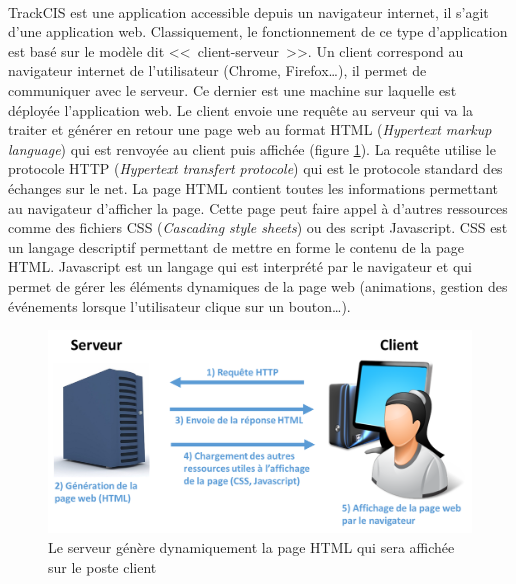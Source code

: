 			\paragraph{}%
			TrackCIS est une application accessible depuis un navigateur internet, il
			s'agit d'une application web. Classiquement, le fonctionnement de ce type
			d'application est basé sur le modèle dit <<~client-serveur~>>. Un client
			correspond au navigateur internet de l'utilisateur (Chrome, Firefox\ldots),
			il permet de communiquer avec le serveur. Ce dernier est une machine sur
			laquelle est déployée l'application web. Le client envoie une requête au
			serveur qui va la traiter et générer en retour une page web au format HTML
			(\textit{Hypertext markup language}) qui est renvoyée au client puis affichée
			(figure \ref{client_serveur}). La requête utilise le protocole HTTP
			(\textit{Hypertext transfert protocole}) qui est le protocole standard des
			échanges sur le net. La page HTML contient toutes les informations permettant au
			navigateur d'afficher la page. Cette page peut faire appel à d'autres
			ressources comme des fichiers CSS (\textit{Cascading style sheets}) ou des
			script Javascript. CSS est un langage descriptif permettant de mettre en forme le
			contenu de la page HTML.
			Javascript est un langage qui est interprété par le navigateur et qui
			permet de gérer les éléments dynamiques de la page web (animations, gestion
			des événements lorsque l'utilisateur clique sur un bouton\ldots).
			\begin{figure}[H]
				\centering
				\includegraphics[width=14cm]{../img/part3/client_serveur.png}
				\caption{\label{client_serveur} Le serveur génère dynamiquement la page
				HTML qui sera affichée sur le poste client}
			\end{figure}
			
